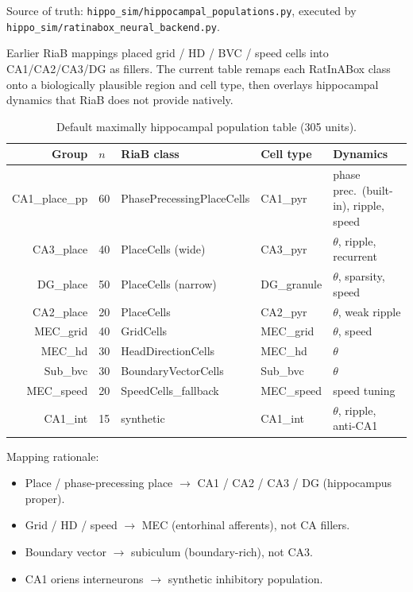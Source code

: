 \documentclass[11pt,a4paper]{article}
\begin{document}
Source of truth: \texttt{hippo\_sim/hippocampal\_populations.py}, executed by \texttt{hippo\_sim/ratinabox\_neural\_backend.py}.

Earlier RiaB mappings placed grid / HD / BVC / speed cells into CA1/CA2/CA3/DG as fillers.
The current table remaps each RatInABox class onto a biologically plausible region and cell type, then overlays hippocampal dynamics that RiaB does not provide natively.

\begin{table}[h]
\centering
\caption{Default maximally hippocampal population table (305 units).}
\label{tab:riab-pops}
\small
\begin{tabular}{@{}rlp{3.2cm}lp{3.6cm}@{}}
\toprule
Group & $n$ & RiaB class & Cell type & Dynamics \\
\midrule
CA1\_place\_pp & 60 & PhasePrecessingPlaceCells & CA1\_pyr & phase prec.\ (built-in), ripple, speed \\
CA3\_place & 40 & PlaceCells (wide) & CA3\_pyr & $\theta$, ripple, recurrent \\
DG\_place & 50 & PlaceCells (narrow) & DG\_granule & $\theta$, sparsity, speed \\
CA2\_place & 20 & PlaceCells & CA2\_pyr & $\theta$, weak ripple \\
MEC\_grid & 40 & GridCells & MEC\_grid & $\theta$, speed \\
MEC\_hd & 30 & HeadDirectionCells & MEC\_hd & $\theta$ \\
Sub\_bvc & 30 & BoundaryVectorCells & Sub\_bvc & $\theta$ \\
MEC\_speed & 20 & SpeedCells\_fallback & MEC\_speed & speed tuning \\
CA1\_int & 15 & synthetic & CA1\_int & $\theta$, ripple, anti-CA1 \\
\bottomrule
\end{tabular}
\end{table}

Mapping rationale:
\begin{itemize}[leftmargin=*]
  \item Place / phase-precessing place $\to$ CA1 / CA2 / CA3 / DG (hippocampus proper).
  \item Grid / HD / speed $\to$ MEC (entorhinal afferents), not CA fillers.
  \item Boundary vector $\to$ subiculum (boundary-rich), not CA3.
  \item CA1 oriens interneurons $\to$ synthetic inhibitory population.
\end{itemize}
\end{document}
